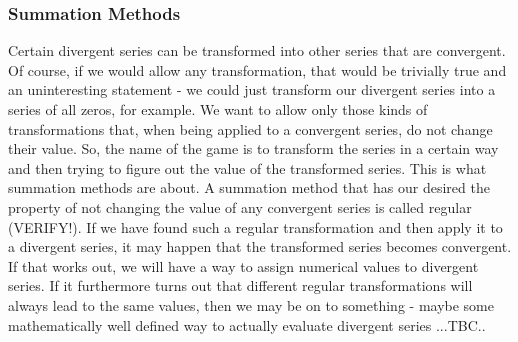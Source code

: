 






\subsubsection{Summation Methods} Certain divergent series can be transformed into other series that are convergent. Of course, if we would allow any transformation, that would be trivially true and an uninteresting statement - we could just transform our divergent series into a series of all zeros, for example. We want to allow only those kinds of transformations that, when being applied to a convergent series, do not change their value. So, the name of the game is to transform the series in a certain way and then trying to figure out the value of the transformed series. This is what summation methods are about. A summation method that has our desired the property of not changing the value of any convergent series is called regular (VERIFY!). If we have found such a regular transformation and then apply it to a divergent series, it may happen that the transformed series becomes convergent. If that works out, we will have a way to assign numerical values to divergent series. If it furthermore turns out that different regular transformations will always lead to the same values, then we may be on to something - maybe some mathematically well defined way to actually evaluate divergent series ...TBC..


